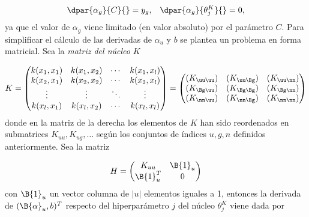 \begin{align}
  \dpar{\alpha_g}{C}{} = y_g, && \dpar{\alpha_g}{{\theta}^K_j}{} = 0,
\end{align}
ya que el valor de $\alpha_g$ viene limitado (en valor absoluto) por el
parámetro $C$. Para simplificar el cálculo de las derivadas de
$\alpha_u$ y $b$ se plantea un problema en forma matricial. Sea la
\emph{matriz del núcleo} $K$

\begin{align}
  K = \begin{pmatrix} k(x_1,x_1) & k(x_1,x_2) & \cdots & k(x_1,x_l)
    \\ k(x_2,x_1) & k(x_2,x_2) & \cdots & k(x_2,x_l) \\ \vdots &
    \vdots & \ddots & \vdots \\ k(x_l,x_1) & k(x_l,x_2) & \cdots &
    k(x_l,x_l)
  \end{pmatrix}
  =
  \begin{pmatrix}
    (K_{\uu\uu}) & (K_{\uu\Bg}) & (K_{\uu\nn}) \\
    (K_{\Bg\uu}) & (K_{\Bg\Bg}) & (K_{\Bg\nn}) \\
    (K_{\nn\uu}) & (K_{\nn\Bg}) & (K_{\nn\nn})
  \end{pmatrix}
\end{align}
donde en la matriz de la derecha los elementos de $K$ han sido
reordenados en submatrices $K_{uu},K_{ug},\ldots$ según los conjuntos
de índices $u, g, n$ definidos anteriormente.  Sea la matriz

\begin{align}
  H=\begin{pmatrix} K_{uu} & \B{1}_u \\ \B{1}_u^T & 0
  \end{pmatrix}
\end{align}
con $\B{1}_u$ un vector columna de $|u|$ elementos iguales a 1,
entonces la derivada de $(\B{\alpha}_u,b)^T$ respecto del
hiperparámetro $j$ del núcleo $\theta^K_j$ viene dada por

